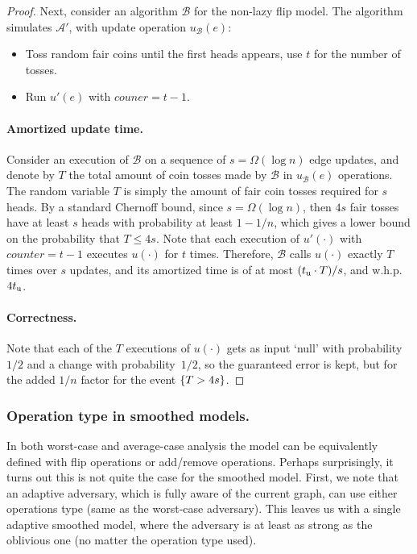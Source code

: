 \documentclass[letter,11pt]{article}
\newcommand{\tu}{t_{\textnormal{u}}}
\newcommand{\alg}[1]{{\mathcal{#1}}}
\begin{document}
\begin{proof}
	Next, consider an algorithm $\alg{B}$ for the non-lazy flip model.
	The algorithm simulates $\alg{A'}$, with update operation $u_{\alg{B}}(e)$:
	\begin{itemize}
		\item Toss random fair coins until the first heads appears, use $t$ for the number of tosses. 
		
		\item Run $u'(e)$ with $couner = t-1$.
	\end{itemize}
	
	\paragraph{Amortized update time.} Consider an execution of $\alg{B}$ on a sequence of $s = \Omega(\log n)$ edge updates, and denote by $T$ the total amount of coin tosses made by $\alg{B}$ in
	$u_{\alg{B}}(e)$ operations.
	The random variable $T$ is simply the amount of fair coin tosses required for $s$ heads.
	By a standard Chernoff bound, since $s = \Omega(\log n)$, then $4s$ fair tosses have at least $s$ heads with probability at least $1 - 1/n$, which gives a lower bound on the probability that $T \leq 4s$.
	Note that each execution of $u'(\cdot)$ with $counter = t-1$ executes $u(\cdot)$ for $t$ times. Therefore, $\alg{B}$ calls $u(\cdot)$ exactly $T$ times over $s$ updates, and its amortized time is of at most $(\tu \cdot T)/s$, and w.h.p. $4 \tu$.
	
	\paragraph{Correctness.} Note that each of the $T$ executions of $u(\cdot)$ gets as input `null' with probability~$1/2$ and a change with probability~$1/2$, so the guaranteed error is kept, but for the added $1/n$ factor for the event $\{T > 4s\}$.
\end{proof}

\subsubsection*{Operation type in smoothed models.}
In both worst-case and average-case analysis the model can be equivalently defined with flip operations or add/remove operations. 
Perhaps surprisingly, it turns out this is not quite the case for the smoothed model.
First, we note that an adaptive adversary, which is fully aware of the current graph, can use either operations type (same as the worst-case adversary). 
This leaves us with a single adaptive smoothed model, where the adversary is at least as strong as the oblivious one (no matter the operation type used).
\end{document}
